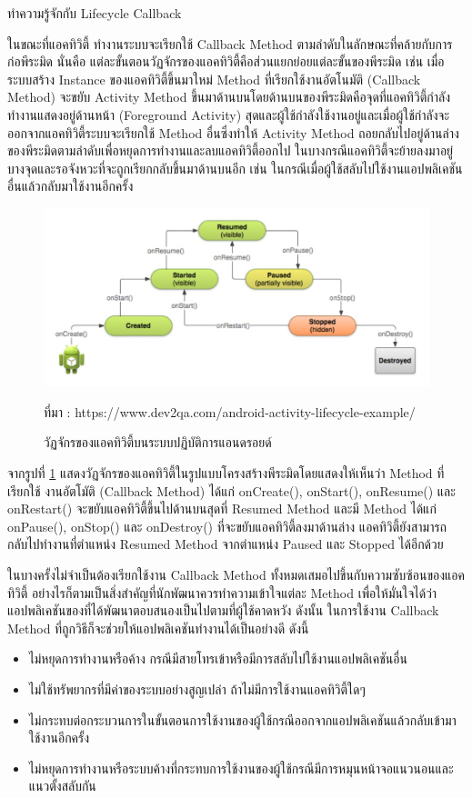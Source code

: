 	ทำความรู้จักกับ Lifecycle Callback

	
	ในขณะที่แอคทิวิตี้ \cite{ActivityLifeCycle} ทำงานระบบจะเรียกใช้ Callback Method ตามลำดับในลักษณะที่คล้ายกับการก่อพีระมิด นั่นคือ แต่ละขั้นตอนวัฏจักรของแอคทิวิตี้คือส่วนแยกย่อยแต่ละขั้นของพีระมิด
	เช่น เมื่อระบบสร้าง Instance ของแอคทิวิตี้ขึ้นมาใหม่ Method ที่เรียกใช้งานอัตโนมัติ (Callback Method) จะขยับ Activity Method ขึ้นมาด้านบนโดยด้านบนของพีระมิดคือจุดที่แอคทิวิตี้กำลังทำงานแสดงอยู่ด้านหน้า (Foreground Activity) สุดและผู้ใช้กำลังใช้งานอยู่และเมื่อผู้ใช้กำลังจะออกจากแอคทิวิตี้ระบบจะเรียกใช้ Method อื่นซึ่งทำให้ Activity Method
	ถอยกลับไปอยู่ด้านล่างของพีระมิดตามลำดับเพื่อหยุดการทำงานและลบแอคทิวิตี้ออกไป ในบางกรณีแอคทิวิตี้จะย้ายลงมาอยู่บางจุดและรอจังหวะที่จะถูกเรียกกลับขึ้นมาด้านบนอีก เช่น ในกรณีเมื่อผู้ใช้สลับไปใช้งานแอปพลิเคชันอื่นแล้วกลับมาใช้งานอีกครั้ง
	
	\begin{figure}[H]
		\centering
		\includegraphics[width=0.8\columnwidth]{Figures/2/lifecycle}
		\caption{วัฏจักรของแอคทิวิตี้บนระบบปฏิบัติการแอนดรอยด์}{ที่มา : https://www.dev2qa.com/android-activity-lifecycle-example/}
		\label{Fig:lifecycle}
	\end{figure}

	จากรูปที่ \ref{Fig:lifecycle} แสดงวัฏจักรของแอคทิวิตี้ในรูปแบบโครงสร้างพีระมิดโดยแสดงให้เห็นว่า Method ที่เรียกใช้
	งานอัตโมัติ (Callback Method) ได้แก่ onCreate(), onStart(), onResume() และ onRestart() จะขยับแอคทิวิตี้ขึ้นไปด้านบนสุดที่ Resumed Method
	และมี Method ได้แก่ onPause(), onStop() และ onDestroy() ที่จะขยับแอคทิวิตี้ลงมาด้านล่าง แอคทิวิตี้ยังสามารถกลับไปทำงานที่ตำแหน่ง Resumed Method จากตำแหน่ง Paused และ Stopped ได้อีกด้วย
	
	ในบางครั้งไม่จำเป็นต้องเรียกใช้งาน Callback Method ทั้งหมดเสมอไปขึ้นกับความซับซ้อนของแอคทิวิตี้ อย่างไรก็ตามเป็นสิ่งสำคัญที่นักพัฒนาควรทำความเข้าใจแต่ละ Method เพื่อให้มั่นใจได้ว่าแอปพลิเคชันของที่ได้พัฒนาตอบสนองเป็นไปตามที่ผู้ใช้คาดหวัง ดังนั้น ในการใช้งาน Callback Method
	ที่ถูกวิธีก็จะช่วยให้แอปพลิเคชันทำงานได้เป็นอย่างดี ดังนี้
	\begin{itemize}
		\item ไม่หยุดการทำงานหรือค้าง กรณีมีสายโทรเข้าหรือมีการสลับไปใช้งานแอปพลิเคชันอื่น 
		\item ไม่ใช้ทรัพยากรที่มีค่าของระบบอย่างสูญเปล่า ถ้าไม่มีการใช้งานแอคทิวิตี้ใดๆ 
		\item ไม่กระทบต่อกระบวนการในขั้นตอนการใช้งานของผู้ใช้กรณีออกจากแอปพลิเคชันแล้วกลับเข้ามาใช้งานอีกครั้ง 
		\item ไม่หยุดการทำงานหรือระบบค้างที่กระทบการใช้งานของผู้ใช้กรณีมีการหมุนหน้าจอแนวนอนและแนวตั้งสลับกัน
	\end{itemize}
	
